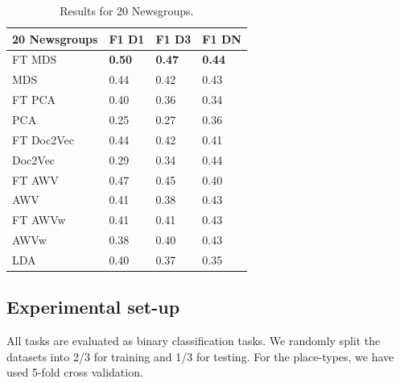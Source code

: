 \begin{table}[t]
	\centering
	\setlength{\tabcolsep}{8pt}
	\begin{tabularx}{\columnwidth}{llll}
		\toprule
		\textbf{20 Newsgroups}  & F1 D1 & F1 D3 & F1 DN \\
		\midrule
		FT MDS        & \textbf{0.50} & \textbf{0.47} & \textbf{0.44} \\
		MDS           & 0.44 & 0.42 & 0.43  \\
		FT PCA       & 0.40  & 0.36  & 0.34  \\
		PCA         & 0.25  & 0.27  & 0.36  \\
		FT Doc2Vec   & 0.44  & 0.42  & 0.41  \\
		Doc2Vec     & 0.29  & 0.34  & 0.44  \\
		FT AWV        & 0.47 & 0.45 & 0.40  \\
		AWV           & 0.41 & 0.38 & 0.43  \\
		FT AWVw  & 0.41  & 0.41  & 0.43  \\
		AWVw    & 0.38  & 0.40  & 0.43 \\
		LDA           & 0.40 & 0.37 & 0.35 \\  
		\bottomrule
	\end{tabularx}
	
	\caption{Results for 20 Newsgroups. \label{tabNGspaces}}
\end{table}


\subsection{Experimental set-up}

All tasks are evaluated as binary classification tasks. We randomly split the datasets into 2/3 for training and 1/3 for testing. For the place-types, we have used 5-fold cross validation. 



